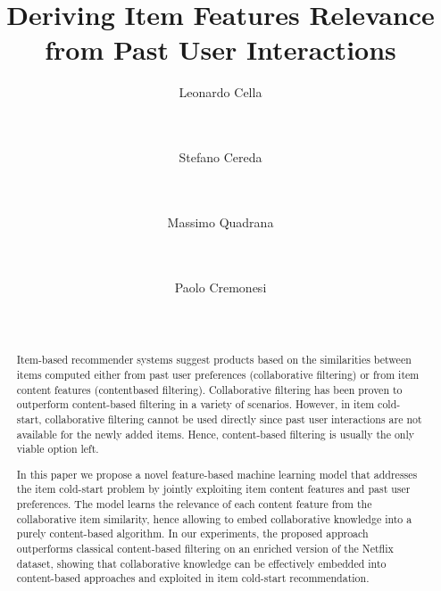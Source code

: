 \documentclass{sig-alternate}
\begin{document}
\title{Deriving Item Features Relevance from Past User Interactions}

\author{
\and
\and
\and
\alignauthor
Leonardo Cella\\
       \\
       \\
       \and
       \and
       \and
\alignauthor
Stefano Cereda\\
       \\
       \\
\and
\and
\and
\and
\alignauthor
Massimo Quadrana\\
       \\
       \\
       \and
       \and
\alignauthor
Paolo Cremonesi\\
       \\
       \\
}
\maketitle

\begin{abstract}
Item-based recommender systems suggest products based on the
similarities between items computed either from past user preferences
(collaborative filtering) or from item content features (contentbased 
filtering). Collaborative filtering has been proven to outperform 
content-based filtering in a variety of scenarios. However, in
item cold-start, collaborative filtering cannot be used directly since
past user interactions are not available for the newly added items.
Hence, content-based filtering is usually the only viable option left.


In this paper we propose a novel feature-based machine learning
model that addresses the item cold-start problem by jointly exploiting
item content features and past user preferences. The model
learns the relevance of each content feature from the collaborative
item similarity, hence allowing to embed collaborative knowledge
into a purely content-based algorithm. In our experiments, the
proposed approach outperforms classical content-based filtering
on an enriched version of the Netflix dataset, showing that collaborative
knowledge can be effectively embedded into content-based
approaches and exploited in item cold-start recommendation.

\end{abstract}
\end{document}
